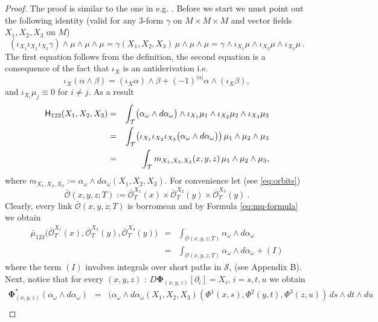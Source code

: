 \documentclass[12pt]{article}
\newcommand{\no}{\noindent}
\begin{document}
\begin{proof}
 The proof is similar to the one in e.g. \cite{Vogel03}. Before we start we must point out
 the following identity (valid for any 3-form $\gamma$ on $M\times M\times M$ and vector fields 
 $X_1,X_2,X_3$ on $M$)
 \[
(\iota_{X_1}\iota_{X_2}\iota_{X_3}\gamma)\wedge\mu\wedge\mu\wedge\mu=
\gamma(X_1,X_2,X_3)\,\mu\wedge\mu\wedge\mu=\gamma\wedge\iota_{X_1}\mu\wedge\iota_{X_2}\mu\wedge\iota_{X_3}\mu\ .
 \]
 The first equation follows from the definition, the second equation is a consequence of the fact that 
 $\iota_X$ is an antiderivation i.e.
 \begin{equation}\label{eq:iota-antiderivation}
  \iota_X(\alpha\wedge\beta)=(\iota_X\alpha)\wedge\beta+(-1)^{|\alpha|}\alpha\wedge(\iota_X\beta),
 \end{equation}
   and $\iota_{X_i}\mu_j\equiv 0$ for $i\neq j$. As a result
 \begin{eqnarray*}
\notag  \mathsf{H}_{123}(X_1,X_2,X_3) & = & \int_{\mathcal{T}} \bigl(\alpha_\omega\wedge d\alpha_\omega\bigr)\wedge \iota_{X_1}\mu_1\wedge \iota_{X_2}\mu_2\wedge \iota_{X_3}\mu_3\\
& = & \int_\mathcal{T} \bigl(\iota_{X_1}\iota_{X_2}\iota_{X_3}\bigl(\alpha_\omega\wedge d\alpha_\omega\bigr)\bigr)\,\mu_1\wedge\mu_2\wedge\mu_3\\
\label{eq:m-function}  & = & \int_\mathcal{T} m_{X_1,X_2,X_3}(x,y,z)\,\mu_1\wedge \mu_2\wedge \mu_3,
\end{eqnarray*}
where $m_{X_1,X_2,X_3}:=\alpha_\omega\wedge d\alpha_\omega(X_1,X_2,X_3)$. For convenience let (see \eqref{eq:orbits})
\[
 \bar{\mathscr{O}}(x,y,z;T):=\bar{\mathscr{O}}^{X_1}_T(x)\times \bar{\mathscr{O}}^{X_2}_T(y)\times\bar{\mathscr{O}}^{X_3}_T(y)\ .
\]
\no Clearly, every link $\bar{\mathscr{O}}(x,y,z;T)$ is borromean and by Formula \eqref{eq:mu-formula} we obtain
\begin{eqnarray*}
\bar{\mu}_{123}\bigl(\bar{\mathscr{O}}^{X_1}_T(x),\bar{\mathscr{O}}^{X_2}_T(y),\bar{\mathscr{O}}^{X_3}_T(y)\big)
& = & \int_{\bar{\mathscr{O}}(x,y,z;T)}
\alpha_\omega\wedge d\alpha_\omega\\
& = & \int_{\mathscr{O}(x,y,z;T)}
\alpha_\omega\wedge d\alpha_\omega+(I)
\end{eqnarray*}
where the term $(I)$ involves integrals over short paths in $\mathcal{S}$, (see Appendix B). Next, notice that for every $(x,y,z)$ : $D\mathbf{\Phi}_{(x,y,z)}[\partial_i]=X_i$, $i=s,t,u$ we obtain
\begin{eqnarray*}
 \mathbf{\Phi}^\ast_{(x,y,z)}(\alpha_\omega\wedge d\alpha_\omega) & = & (\alpha_\omega\wedge d\alpha_\omega(X_1,X_2,X_3)(\Phi^1(x,s),\Phi^2(y,t),\Phi^3(z,u))\,ds\wedge dt\wedge du\\

\end{eqnarray*}
\end{proof}
\end{document}
